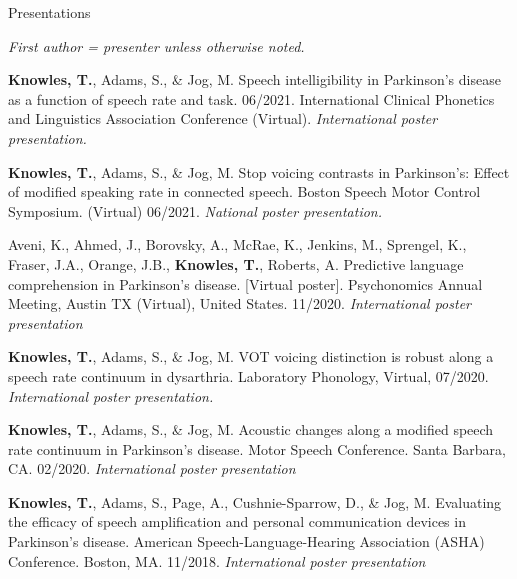 \documentclass{resume} %
\begin{document}
\begin{rSection}{Presentations}
\begin{center}
	\emph{First author = presenter unless otherwise noted.}
\end{center}

\begin{etaremune}

\item {\bf Knowles, T.}, Adams, S., \& Jog, M. Speech intelligibility in Parkinson's disease as a function of speech rate and task. 06/2021. International Clinical Phonetics and Linguistics Association Conference (Virtual). \emph{International poster presentation.}

\item {\bf Knowles, T.}, Adams, S., \& Jog, M. Stop voicing contrasts in Parkinson's: Effect of modified speaking rate in connected speech. Boston Speech Motor Control Symposium. (Virtual) 06/2021. \emph{National poster presentation.}

\item Aveni, K., Ahmed, J., Borovsky, A., McRae, K., Jenkins, M., Sprengel, K., Fraser, J.A., Orange, J.B., {\bf Knowles, T.}, Roberts, A. Predictive language comprehension in Parkinson’s disease. [Virtual poster]. Psychonomics Annual Meeting, Austin TX (Virtual), United States. 11/2020. \emph{International poster presentation}

\item  {\bf Knowles, T.}, Adams, S., \& Jog, M. VOT voicing distinction is robust along a speech rate continuum in dysarthria. Laboratory Phonology, Virtual, 07/2020.  \emph{International poster presentation.}
   
\item {\bf Knowles, T.}, Adams, S., \& Jog, M. Acoustic changes along a modified speech rate continuum in Parkinson's disease. Motor Speech Conference. Santa Barbara, CA. 02/2020. \emph{International poster presentation}

\item {\bf Knowles, T.}, Adams, S., Page, A., Cushnie-Sparrow, D., \& Jog, M. Evaluating the efficacy of speech amplification and personal communication devices in Parkinson's disease. American Speech-Language-Hearing Association (ASHA) Conference. Boston, MA. 11/2018. \emph{International poster presentation}
	

\end{etaremune}
\end{rSection}
\end{document}
